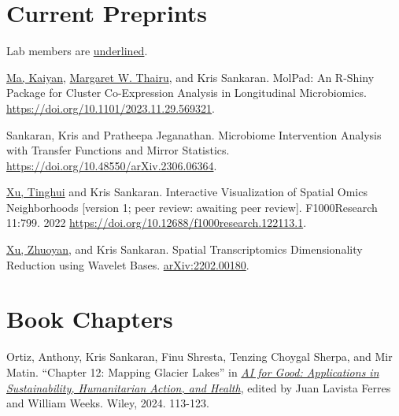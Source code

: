 \documentclass[letterpaper]{article}
\renewenvironment{itemize}{
  \begin{list}{}{
    \setlength{\leftmargin}{1.5em}
  }
}{
  \end{list}
}
\begin{document}
\section*{Current Preprints}
Lab members are \underline{underlined}.
\begin{itemize}
\item \underline{Ma, Kaiyan}, \underline{Margaret W. Thairu}, and Kris Sankaran. MolPad:
An R-Shiny Package for Cluster Co-Expression Analysis in Longitudinal
Microbiomics.
\href{https://doi.org/10.1101/2023.11.29.569321}{https://doi.org/10.1101/2023.11.29.569321}.
\item Sankaran, Kris and Pratheepa Jeganathan. Microbiome Intervention Analysis
with Transfer Functions and Mirror Statistics.
\href{https://doi.org/10.48550/arXiv.2306.06364}{https://doi.org/10.48550/arXiv.2306.06364}.
\item \underline{Xu, Tinghui} and Kris Sankaran. Interactive Visualization of
Spatial Omics Neighborhoods [version 1; peer review: awaiting peer review]. F1000Research 11:799. 2022
\href{https://doi.org/10.12688/f1000research.122113.1}{https://doi.org/10.12688/f1000research.122113.1}.
\item \underline{Xu, Zhuoyan}, and Kris Sankaran. Spatial Transcriptomics
Dimensionality Reduction using Wavelet Bases. \href{https://arxiv.org/abs/2202.00180}{arXiv:2202.00180}.
\end{itemize}

\section*{Book Chapters}
\begin{itemize}
\item Ortiz, Anthony, Kris Sankaran, Finu Shresta, Tenzing Choygal Sherpa, and
Mir Matin. “Chapter 12: Mapping Glacier Lakes” in \href{https://www.wiley.com/en-us/AI+for+Good%3A+Applications+in+Sustainability%2C+Humanitarian+Action%2C+and+Health-p-9781394235889}{\textit{AI for Good: Applications in
Sustainability, Humanitarian Action, and Health}}, edited by Juan Lavista Ferres
and William Weeks. Wiley, 2024. 113-123.
\end{itemize}
\end{document}
